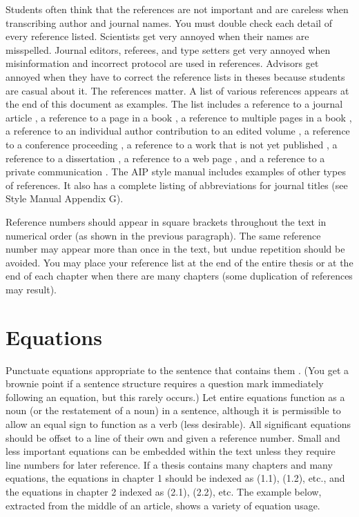Students often think that the references are not important and are
careless when transcribing author and journal names. You must
double check each detail of every reference listed. Scientists get
very annoyed when their names are misspelled. Journal editors,
referees, and type setters get very annoyed when misinformation and
incorrect protocol are used in references. Advisors get annoyed
when they have to correct the reference lists in theses because
students are casual about it. The references matter. A list of
various references appears at the end of this document as examples.
The list includes a reference to a journal article
\cite{Peatross2000}, a reference to a page in a book
\cite{Jackson1998}, a reference to multiple pages in a book
\cite{Born1980}, a reference to an individual author contribution
to an edited volume \cite{Peatross1996}, a reference to a
conference proceeding \cite{Peatross1999}, a reference to a work
that is not yet published \cite{Ware}, a reference to a
dissertation \cite{Peatross1993}, a reference to a web page
\cite{intel}, and a reference to a private communication
\cite{Peatross}. The AIP style manual includes examples of other
types of references. It also has a complete listing of
abbreviations for journal titles (see Style Manual Appendix G).

Reference numbers should appear in square brackets throughout the
text in numerical order (as shown in the previous paragraph). The
same reference number may appear more than once in the text, but
undue repetition should be avoided. You may place your reference
list at the end of the entire thesis or at the end of each chapter
when there are many chapters (some duplication of references may
result).

\section{Equations}
\label{sec:Equations} 

Punctuate equations appropriate to the sentence that contains them
\cite{AIP1990}. (You get a brownie point if a sentence structure
requires a question mark immediately following an equation, but
this rarely occurs.) Let entire equations function as a noun (or
the restatement of a noun) in a sentence, although it is
permissible to allow an equal sign to function as a verb (less
desirable). All significant equations should be offset to a line of
their own and given a reference number. Small and less important
equations can be embedded within the text unless they require line
numbers for later reference. If a thesis contains many chapters and
many equations, the equations in chapter 1 should be indexed as
(1.1), (1.2), etc., and the equations in chapter 2 indexed as
(2.1), (2.2), etc. The example below, extracted from the middle of
an article, shows a variety of equation usage.

